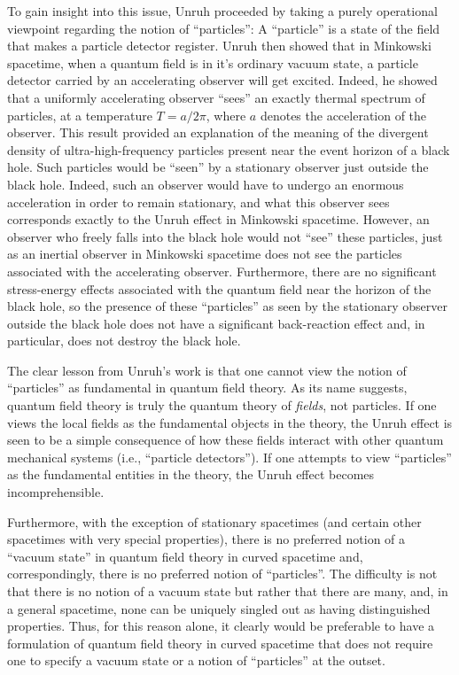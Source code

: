 \documentclass[12pt,epsf,amsfonts,amssymb]{article}
\begin{document}
To gain insight into this issue, Unruh \cite{u2} proceeded by taking a
purely operational viewpoint regarding the notion of ``particles'': A
``particle'' is a state of the field that makes a particle detector
register. Unruh then showed that in Minkowski spacetime, when a
quantum field is in it's ordinary vacuum state, a particle detector
carried by an accelerating observer will get excited. Indeed, he
showed that a uniformly accelerating observer ``sees'' an exactly
thermal spectrum of particles, at a temperature $T = a/2 \pi$, where
$a$ denotes the acceleration of the observer. This result provided an
explanation of the meaning of the divergent density of
ultra-high-frequency particles present near the event horizon of a
black hole. Such particles would be ``seen'' by a stationary observer
just outside the black hole. Indeed, such an observer would have to
undergo an enormous acceleration in order to remain stationary, and
what this observer sees corresponds exactly to the Unruh effect in
Minkowski spacetime. However, an observer who freely falls into the
black hole would not ``see'' these particles, just as an inertial
observer in Minkowski spacetime does not see the particles associated
with the accelerating observer. Furthermore, there are no significant
stress-energy effects associated with the quantum field near the
horizon of the black hole, so the presence of these ``particles'' as
seen by the stationary observer outside the black hole does not have a
significant back-reaction effect and, in particular, does not destroy
the black hole.

The clear lesson from Unruh's work is that one cannot view the notion
of ``particles'' as fundamental in quantum field theory. As its name
suggests, quantum field theory is truly the quantum theory of {\it
fields}, not particles. If one views the local fields as the
fundamental objects in the theory, the Unruh effect is seen to be a
simple consequence of how these fields interact with other quantum
mechanical systems (i.e., ``particle detectors''). If one attempts to view
``particles'' as the fundamental entities in the theory, the Unruh
effect becomes incomprehensible.

Furthermore, with the exception of stationary spacetimes (and certain
other spacetimes with very special properties), there is no preferred
notion of a ``vacuum state'' in quantum field theory in curved
spacetime and, correspondingly, there is no preferred notion of
``particles''. The difficulty is not that there is no notion of a
vacuum state but rather that there are many, and, in a general
spacetime, none can be uniquely singled out as having distinguished
properties. Thus, for this reason alone, it clearly would be
preferable to have a formulation of quantum field theory in curved
spacetime that does not require one to specify a vacuum state or a
notion of ``particles'' at the outset.
\end{document}
